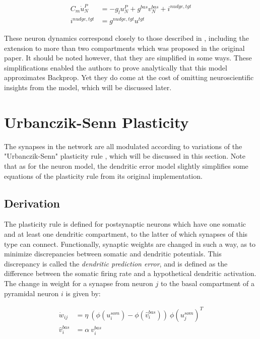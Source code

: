 \begin{align}
  C_m \dot{u}_N^P & = - g_l u_N^{P} + g^{bas} v_N^{bas} + i^{nudge, tgt} \\
  i^{nudge, tgt}  & = g^{nudge, tgt} u^{tgt}
\end{align}


These neuron dynamics correspond closely to those described in \citep{urbanczik2014learning}, including the extension to
more than two compartments which was proposed in the original paper. It should be noted however, that they are
simplified in some ways. These simplifications enabled the authors to prove analytically that this model approximates
Backprop. Yet they do come at the cost of omitting neuroscientific insights from the model, which will be discussed
later.

\section{Urbanczik-Senn Plasticity}\label{sec-urb-senn-plast}

The synapses in the network are all modulated according to variations of the "Urbanczik-Senn" plasticity rule
\citep{urbanczik2014learning}, which will be discussed in this section. Note that as for the neuron model, the dendritic
error model slightly simplifies some equations of the plasticity rule from its original implementation.

\subsection{Derivation}

The plasticity rule is defined for postsynaptic neurons which have one somatic and at least one dendritic compartment,
to the latter of which synapses of this type can connect. Functionally, synaptic weights are changed in such a way, as
to minimize discrepancies between somatic and dendritic potentials. This discrepancy is called the \textit{dendritic
prediction error}, and is defined as the difference between the somatic firing rate and a hypothetical dendritic
activation. The change in weight for a synapse from neuron $j$ to the basal compartment of a pyramidal neuron $i$ is
given by:

\begin{align}
  \dot{w}_{ij}    & = \eta \ ( \phi(u_i^{som}) - \phi(\hat{v}_i^{bas}) ) \ \phi(u_j^{som})^T \\
  \hat{v}_i^{bas} & = \alpha \  v_i^{bas}
\end{align}

